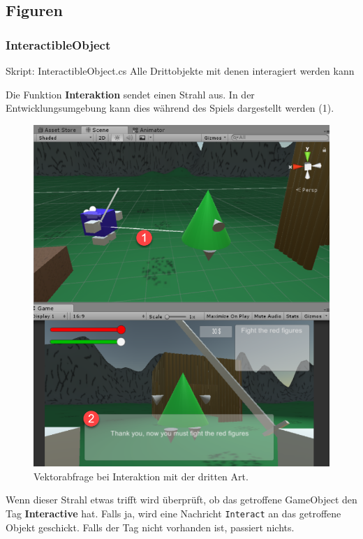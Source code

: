 
\subsection{Figuren}

\subsubsection{InteractibleObject}
\label{subsubsec:interactibleobject}
Skript: InteractibleObject.cs
Alle Drittobjekte mit denen interagiert werden kann

Die Funktion \textbf{Interaktion} sendet einen Strahl aus. In der Entwicklungsumgebung kann dies während des Spiels dargestellt werden (1).

\begin{figure}[H]
\includegraphics[scale=0.5]{screenshots/raycastthirdkind.png}
\caption{Vektorabfrage bei Interaktion mit der dritten Art.}
\end{figure}

Wenn dieser Strahl etwas trifft wird überprüft, ob das getroffene GameObject den Tag \textbf{Interactive} hat. Falls ja, wird eine Nachricht \lstinline{Interact} an das getroffene Objekt geschickt. Falls der Tag nicht vorhanden ist, passiert nichts.

